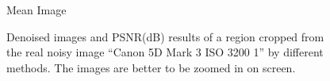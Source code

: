 \begin{figure}
{\begin{minipage}[t]{0.19\textwidth}
{\footnotesize Mean Image}
\end{minipage}
}
\caption{Denoised images and PSNR(dB) results of a region cropped from the real noisy image ``Canon 5D Mark 3 ISO 3200 1'' \cite{crosschannel2016} by different methods. The images are better to be zoomed in on screen.}
    \label{fig3-12}
\end{figure}


\begin{figure}
   \centering
{}
\end{figure}
